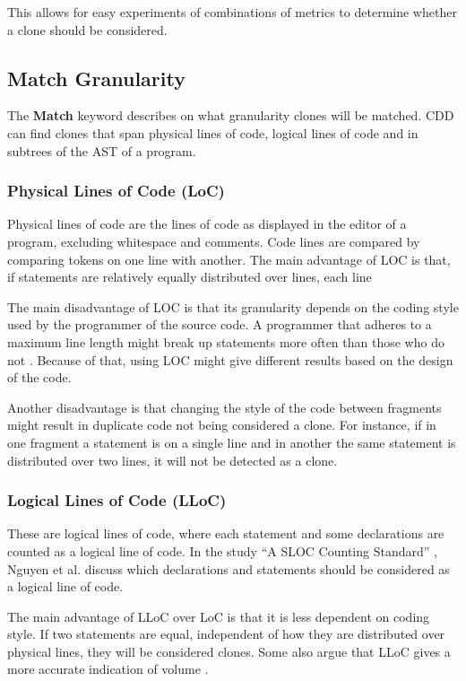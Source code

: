 \documentclass[sigplan,10pt,review,anonymous]{acmart}
\begin{document}
This allows for easy experiments of combinations of metrics to determine whether a clone should be considered.

\subsection{Match Granularity}
The \textbf{Match} keyword describes on what granularity clones will be matched. CDD can find clones that span physical lines of code, logical lines of code and in subtrees of the AST of a program.%

\subsubsection{Physical Lines of Code (LoC)}
Physical lines of code are the lines of code as displayed in the editor of a program, excluding whitespace and comments. Code lines are compared by comparing tokens on one line with another. The main advantage of LOC is that, if statements are relatively equally distributed over lines, each line

The main disadvantage of LOC is that its granularity depends on the coding style used by the programmer of the source code. A programmer that adheres to a maximum line length might break up statements more often than those who do not \cite{nguyen2007sloc}. Because of that, using LOC might give different results based on the design of the code.

Another disadvantage is that changing the style of the code between fragments might result in duplicate code not being considered a clone. For instance, if in one fragment a statement is on a single line and in another the same statement is distributed over two lines, it will not be detected as a clone.

\subsubsection{Logical Lines of Code (LLoC)}
These are logical lines of code, where each statement and some declarations are counted as a logical line of code. In the study ``A SLOC Counting Standard'' \cite{nguyen2007sloc}, Nguyen et al. discuss which declarations and statements should be considered as a logical line of code.

The main advantage of LLoC over LoC is that it is less dependent on coding style. If two statements are equal, independent of how they are distributed over physical lines, they will be considered clones. Some also argue that LLoC gives a more accurate indication of volume \cite{nguyen2007sloc}.
\end{document}

